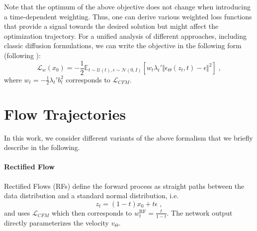 Note that the optimum of the above objective does not change when
introducing a time-dependent weighting. Thus, one can derive various weighted
loss functions that provide a signal towards the desired solution but might
affect the optimization trajectory. For a unified analysis of different
approaches, including classic diffusion formulations, we can write the objective
in the following form (following \citet{Kingma2023UnderstandingDO}):
\begin{equation*}
  \mathcal{L}_w(x_0) = -\frac{1}{2} \mathbb{E}_{t\sim\mathcal{U}(t), \epsilon\sim \mathcal{N}(0, I)}
  \left[ w_t \lambda_t' \Vert \epsilon_\Theta(z_t, t) - \epsilon
  \Vert^2 \right]\;,
\end{equation*}
%
where $w_t = -\frac{1}{2} \lambda_t' b_t^2$ corresponds to $\mathcal{L}_{CFM}$.


%
%
%
%
%
%
%
%
%

%
%
%
%
%
%
%
%
%
%
%
%

%
%
%
%
%
%
%
%
%
%
%
%
%
%
%
%
%
%
%
%
%
%
%
%
%
%
%
%
%
%
%
%
%
%
%
%
%
%

%
%
%
%
%
%
%
%
%
%
%
%
%
%
%
  
%
%
%
%
%
%
%
%
%
%
%
%
%
%
%
%
%
%
%
%
%
%
%

%


%
%
\section{Flow Trajectories}
%
\label{subsec:variants}
%
%
%
%
In this work, we consider different variants of the above formalism that we
briefly describe in the following.

\paragraph{Rectified Flow}
Rectified Flows (RFs) \cite{liu2022flow,albergo2022building,lipman2023flow} define the forward process as straight paths
between the data distribution and a standard normal distribution, i.e.
\begin{equation}
z_t = (1-t) x_0 + t \epsilon\;,
\end{equation}
and uses $\mathcal{L}_{CFM}$ which then corresponds to $w_t^\text{RF} = \frac{t}{1-t}$. The network output directly parameterizes the velocity $v_\Theta$.
%
%
%
%
%
%
%
%
%


